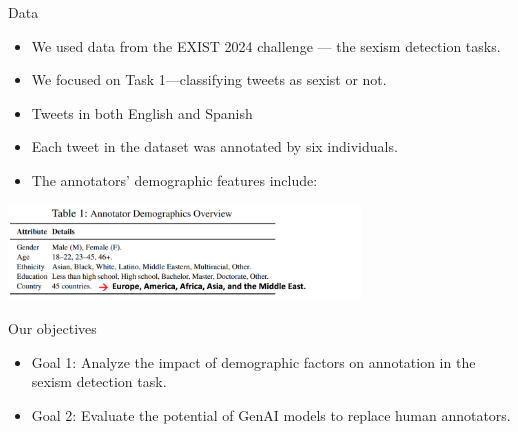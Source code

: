 \documentclass[t,xcolor={dvipsnames},final,aspectratio=169]{beamer}
\begin{document}
\begin{frame}{Data}
\begin{itemize}
\item We used data from the EXIST 2024 challenge — the sexism detection tasks.
\item  We focused on Task 1—classifying tweets as sexist or not.
\item Tweets in both English and Spanish
\item Each tweet in the dataset was annotated by six individuals.
\item The annotators' demographic features include:
\end{itemize}
\begin{center}
\includegraphics[width=0.7\textwidth]{img/demographics.png}
\end{center}
\end{frame}

\begin{frame}{Our objectives}
\begin{itemize}
\item Goal 1: Analyze the impact of demographic factors on annotation in the sexism detection task. 

\item Goal 2: Evaluate the potential of GenAI models to replace human annotators. 
\end{itemize}
\end{frame}
\end{document}
